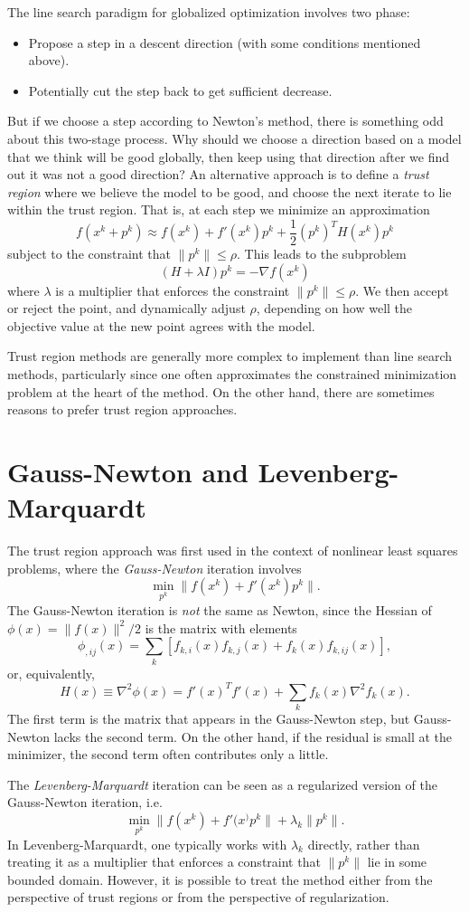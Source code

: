 \documentclass[12pt, leqno]{article} %
\begin{document}
The line search paradigm for globalized optimization involves
two phase:
\begin{itemize}
\item Propose a step in a descent direction (with some conditions
  mentioned above).
\item Potentially cut the step back to get sufficient decrease.
\end{itemize}
But if we choose a step according to Newton's method, there is
something odd about this two-stage process.  Why should we choose
a direction based on a model that we think will be good globally,
then keep using that direction after we find out it was not a
good direction?  An alternative approach is to define a
{\em trust region} where we believe the model to be good,
and choose the next iterate to lie within the trust region.
That is, at each step we minimize an approximation
\[
  f(x^k+p^k) \approx f(x^k) + f'(x^k) p^k + \frac{1}{2} (p^k)^T H(x^k) p^k
\]
subject to the constraint that $\|p^k\| \leq \rho$.  This leads to the
subproblem
\[
  (H+\lambda I) p^k = -\nabla f(x^k)
\]
where $\lambda$ is a multiplier that enforces the constraint $\|p^k\|
\leq \rho$.  We then accept or reject the point, and dynamically
adjust $\rho$, depending on how well the objective value at the new
point agrees with the model.

Trust region methods are generally more complex to implement than line
search methods, particularly since one often approximates the
constrained minimization problem at the heart of the method.  On the
other hand, there are sometimes reasons to prefer trust region
approaches.

\section*{Gauss-Newton and Levenberg-Marquardt}

The trust region approach was first used in the context of nonlinear
least squares problems, where the {\em Gauss-Newton} iteration
involves
\[
  \min_{p^k} \|f(x^k) + f'(x^k) p^k\|.
\]
The Gauss-Newton iteration is {\em not} the same as Newton,
since the Hessian of $\phi(x) = \|f(x)\|^2/2$ is the matrix
with elements
\[
  \phi_{,ij}(x) = \sum_k [f_{k,i}(x) f_{k,j}(x) + f_{k}(x) f_{k,ij}(x)],
\]
or, equivalently,
\[
  H(x) \equiv \nabla^2 \phi(x) = f'(x)^T f'(x) + \sum_{k} f_k(x) \nabla^2 f_k(x).
\]
The first term is the matrix that appears in the Gauss-Newton step,
but Gauss-Newton lacks the second term.  On the other hand, if the
residual is small at the minimizer, the second term often contributes
only a little.

The {\em Levenberg-Marquardt} iteration can be seen as a regularized
version of the Gauss-Newton iteration, i.e.
\[
  \min_{p^k} \|f(x^k) + f'(x^) p^k\| + \lambda_k \|p^k\|.
\]
In Levenberg-Marquardt, one typically works with $\lambda_k$ directly,
rather than treating it as a multiplier that enforces a constraint
that $\|p^k\|$ lie in some bounded domain.  However, it is possible to
treat the method either from the perspective of trust regions or
from the perspective of regularization.
\end{document}
